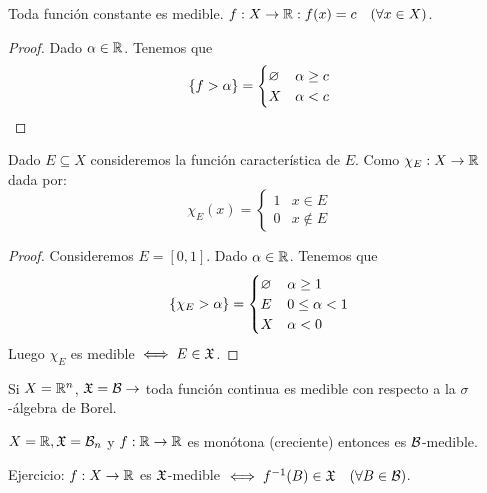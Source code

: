 \begin{eg}
    Toda función constante es medible. $f: X \to \mathbb{R} : f(x) = c \quad (\forall x \in X)$.
    \begin{proof}
        Dado $\alpha \in \mathbb{R}$. Tenemos que \begin{equation*}
            \{ f > \alpha \} = \begin{cases}
                \varnothing & \alpha \geq c \\
                X  & \alpha < c
            \end{cases}
        \end{equation*}
    \end{proof}
\end{eg}

\begin{eg}
    Dado $E \subseteq X$ consideremos la función característica de $E$. Como $\chi_E: X \to \mathbb{R}$ dada por:
    \begin{equation*}
        \chi_E(x) = \begin{cases}
            1 & x \in E    \\
            0 & x \notin E
        \end{cases}
    \end{equation*}
    \begin{proof}
        Consideremos $E = [0, 1]$. Dado $\alpha \in \mathbb{R}$. Tenemos que \begin{equation*}
            \{ \chi_E > \alpha \} = \begin{cases}
                \varnothing & \alpha \geq 1     \\
                E  & 0 \leq \alpha < 1 \\
                X  & \alpha < 0
            \end{cases}
        \end{equation*}
        Luego $\chi_E$ es medible $\iff E \in \mathfrak{X}$.
    \end{proof}
\end{eg}

\begin{eg}
    Si $X = \mathbb{R}^n$, $\mathfrak{X} = \mathcal{B} \to$ toda función continua es medible con respecto a la $\sigma$-álgebra de Borel.
\end{eg}

\begin{eg}
    $X = \mathbb{R}, \mathfrak{X} = \mathcal{B}_n$ y $f: \mathbb{R} \to \mathbb{R}$ es monótona (creciente) entonces es $\mathcal{B}$-medible.
\end{eg}

Ejercicio: $f: X \to \mathbb{R}$ es $\mathfrak{X}$-medible $\iff f^{-1}(B) \in \mathfrak{X} \quad (\forall B \in \mathcal{B})$.

